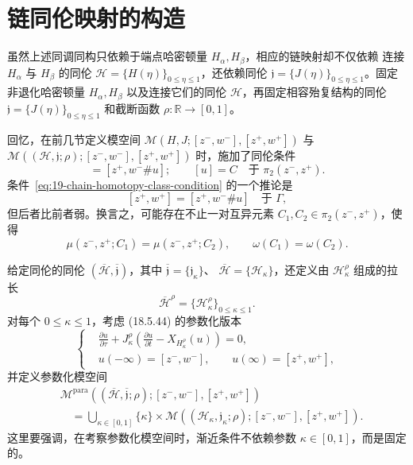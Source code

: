 \section{链同伦映射的构造}
\label{sec:construction-chain-homotopy-map}

虽然上述同调同构只依赖于端点哈密顿量 $H_\alpha,H_\beta$，相应的链映射却不仅依赖
连接 $H_\alpha$ 与 $H_\beta$ 的同伦
$\mathcal H=\{H(\eta)\}_{0\leq\eta\leq1}$，还依赖同伦
$\mathfrak j=\{J(\eta)\}_{0\leq\eta\leq1}$。固定非退化哈密顿量
$H_\alpha,H_\beta$ 以及连接它们的同伦 $\mathcal H$，再固定相容殆复结构的同伦
$\mathfrak j=\{J(\eta)\}_{0\leq\eta\leq1}$ 和截断函数
$\rho:\mathbb R\to[0,1]$。

回忆，在前几节定义模空间
$\mathcal M(H,J;[z^-,w^-],[z^+,w^+])$ 与\allowbreak
$\mathcal M((\mathcal H,\mathfrak j;\rho);[z^-,w^-],[z^+,w^+])$ 时，施加了同伦条件
\begin{equation}
 [z^+,w^+]=[z^+,w^-\#u];\qquad
 [u]=C\quad\text{于 }\pi_2(z^-,z^+).
\label{eq:19-chain-homotopy-class-condition}
\end{equation}
条件~\eqref{eq:19-chain-homotopy-class-condition} 的一个推论是
\[
 [z^+,w^+]=[z^+,w^-\#u]\quad\text{于 }\Gamma,
\]
但后者比前者弱。换言之，可能存在不止一对互异元素
$C_1,C_2\in\pi_2(z^-,z^+)$，使得
\[
 \mu(z^-,z^+;C_1)=\mu(z^-,z^+;C_2),
 \qquad\omega(C_1)=\omega(C_2).
\]

给定同伦的同伦 $(\overline{\mathcal H},\overline{\mathfrak j})$，其中
$\overline{\mathfrak j}=\{\mathfrak j_\kappa\}$、
$\overline{\mathcal H}=\{\mathcal H_\kappa\}$，还定义由
$\mathcal H_\kappa^\rho$ 组成的拉长
\[
 \overline{\mathcal H}^{\rho}
 =\{\mathcal H_\kappa^\rho\}_{0\leq\kappa\leq1}.
\]
对每个 $0\leq\kappa\leq1$，考虑 (18.5.44) 的参数化版本
\begin{equation}
 \left\{
 \begin{aligned}
 &\frac{\partial u}{\partial\tau}
 +J_\kappa^\rho\left(\frac{\partial u}{\partial t}
 -X_{H_\kappa^\rho}(u)\right)=0,\\
 &u(-\infty)=[z^-,w^-],\qquad u(\infty)=[z^+,w^+],
 \end{aligned}
 \right.
\label{eq:19-parameterized-continuation-equation}
\end{equation}
并定义参数化模空间
\[
\begin{aligned}
 &\mathcal M^{\mathrm{para}}
 ((\overline{\mathcal H},\overline{\mathfrak j};\rho);
 [z^-,w^-],[z^+,w^+])\\
 &\quad=\bigcup_{\kappa\in[0,1]}\{\kappa\}\times
 \mathcal M((\mathcal H_\kappa,\mathfrak j_\kappa;\rho);
 [z^-,w^-],[z^+,w^+]).
\end{aligned}
\]
这里要强调，在考察参数化模空间时，渐近条件不依赖参数
$\kappa\in[0,1]$，而是固定的。


